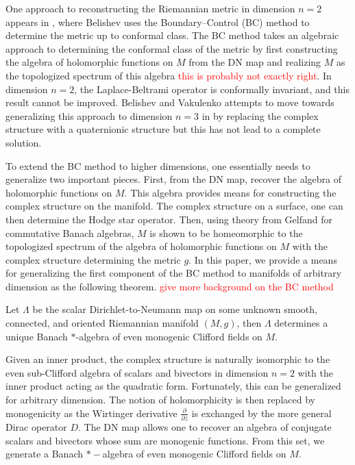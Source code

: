 \documentclass[12pt]{article}
\begin{document}
One approach to reconstructing the Riemannian metric in dimension $n=2$ appears in \cite{belishev_calderon_2003}, where Belishev uses the Boundary--Control (BC) method to determine the metric up to conformal class. The BC method takes an algebraic approach to determining the conformal class of the metric by first constructing the algebra of holomorphic functions on $M$ from the DN map and realizing $M$ as the topologized spectrum of this algebra \textcolor{red}{this is probably not exactly right}. In dimension $n=2$, the Laplace-Beltrami operator is conformally invariant, and this result cannot be improved.  Belishev and Vakulenko attempts to move towards generalizing this approach to dimension $n=3$ in \cite{belishev_algebras_2017, belishev_algebraic_2019} by replacing the complex structure with a quaternionic structure but this has not lead to a complete solution.

To extend the BC method to higher dimensions, one essentially needs to generalize two important pieces. First, from the DN map, recover the algebra of holomorphic functions on $M$.  This algebra provides means for constructing the complex structure on the manifold. The complex structure on a surface, one can then determine the Hodge star operator. Then, using theory from Gelfand for commutative Banach algebras, $M$ is shown to be homeomorphic to the topologized spectrum of the algebra of holomorphic functions on $M$ with the complex structure determining the metric $g$. In this paper, we provide a means for generalizing the first component of the BC method to manifolds of arbitrary dimension as the following theorem. \textcolor{red}{give more background on the BC method}

\begin{theorem}
    Let $\Lambda$ be the scalar Dirichlet-to-Neumann map on some unknown smooth, connected, and oriented Riemannian manifold $(M,g)$, then $\Lambda$ determines a unique Banach $\ast$-algebra of even monogenic Clifford fields on $M$.
\end{theorem}

Given an inner product, the complex structure is naturally isomorphic to the even sub-Clifford algebra of scalars and bivectors in dimension $n=2$ with the inner product acting as the quadratic form.  Fortunately, this can be generalized for arbitrary dimension.  The notion of holomorphicity is then replaced by monogenicity as the Wirtinger derivative $\frac{\partial}{\partial \overline{z}}$ is exchanged by the more general Dirac operator $D$.  The DN map allows one to recover an algebra of conjugate scalars and bivectors whose sum are monogenic functions. From this set, we generate a Banach $\ast -$algebra of even monogenic Clifford fields on $M$.
\end{document}
